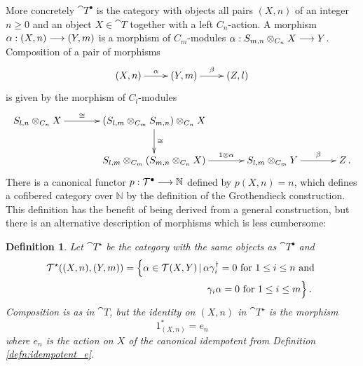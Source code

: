 \documentclass[english,letter paper,12pt,leqno]{article}
\theoremstyle{example}
\newtheorem{definition}[theorem]{Definition}
\numberwithin{equation}{section}
\def\ferm{\gamma}
\def\fermc{\gamma^\dagger}
\begin{document}
More concretely $\cat{T}^\bullet$ is the category with objects all pairs $(X,n)$ of an integer $n \ge 0$ and an object $X \in \cat{T}$ together with a left $C_n$-action. A morphism $\alpha: (X,n) \longrightarrow (Y,m)$ is a morphism of $C_m$-modules $\alpha: S_{m,n} \otimes_{C_n} X \longrightarrow Y$. Composition of a pair of morphisms
\begin{equation}\label{eq:comp_chain0}
\xymatrix{
(X,n) \ar[r]^-{\alpha} & (Y,m) \ar[r]^-{\beta} & (Z,l)
}
\end{equation}
is given by the morphism of $C_l$-modules
\begin{equation}\label{eq:comp_chain1}
\xymatrix@C+1pc{
S_{l, n} \otimes_{C_n} X \ar[r]^-{\cong} & (S_{l,m} \otimes_{C_m} S_{m,n}) \otimes_{C_n} X \ar[d]^-{\cong}\\
& S_{l,m} \otimes_{C_m} ( S_{m,n} \otimes_{C_n} X ) \ar[r]^-{ 1 \otimes \alpha } & S_{l,m} \otimes_{C_m} Y \ar[r]^-{\beta} & Z\,.
}
\end{equation}
There is a canonical functor $p: \mathcal{T}^\bullet \longrightarrow \mathbb{N}$ defined by $p(X,n) = n$, which defines a cofibered category over $\mathbb{N}$ by the definition of the Grothendieck construction. This definition has the benefit of being derived from a general construction, but there is an alternative description of morphisms which is less cumbersome:

\begin{definition} Let $\cat{T}^{\star}$ be the category with the same objects as $\cat{T}^\bullet$ and
\begin{align*}
\cat{T}^{\star}( (X,n), (Y,m) ) &= \Big\{ \alpha \in \cat{T}(X,Y) \l \alpha \fermc_i = 0 \text{ for } 1 \le i \le n \text{ and }\\
&\qquad \qquad\qquad \qquad \;\; \ferm_i \alpha = 0 \text{ for } 1 \le i \le m \Big\}\,.
\end{align*}
Composition is as in $\cat{T}$, but the identity on $(X,n)$ in $\cat{T}^\star$ is the morphism
\[
1^*_{(X,n)} = e_n
\]
where $e_n$ is the action on $X$ of the canonical idempotent from Definition \ref{defn:idempotent_e}.
\end{definition}
\end{document}

